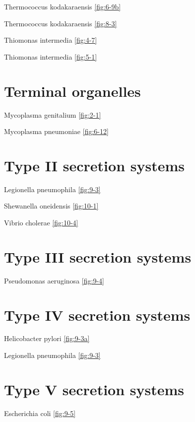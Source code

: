 \documentclass[]{tufte-book}
\begin{document}
Thermococcus kodakaraensis \ref{fig:6-9b}

Thermococcus kodakaraensis \ref{fig:8-3}

Thiomonas intermedia \ref{fig:4-7}

Thiomonas intermedia \ref{fig:5-1}

\section*{Terminal organelles}\label{terminal-organelles}

Mycoplasma genitalium \ref{fig:2-1}

Mycoplasma pneumoniae \ref{fig:6-12}

\section*{Type II secretion systems}\label{type-ii-secretion-systems}

Legionella pneumophila \ref{fig:9-3}

Shewanella oneidensis \ref{fig:10-1}

Vibrio cholerae \ref{fig:10-4}

\section*{Type III secretion systems}\label{type-iii-secretion-systems}

Pseudomonas aeruginosa \ref{fig:9-4}

\section*{Type IV secretion systems}\label{type-iv-secretion-systems}

Helicobacter pylori \ref{fig:9-3a}

Legionella pneumophila \ref{fig:9-3}

\section*{Type V secretion systems}\label{type-v-secretion-systems}

Escherichia coli \ref{fig:9-5}
\end{document}
